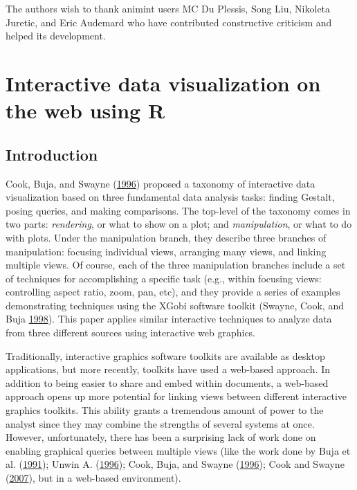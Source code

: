 \documentclass[12pt,]{isuthesis}
\begin{document}
The authors wish to thank animint users MC Du Plessis, Song Liu,
Nikoleta Juretic, and Eric Audemard who have contributed constructive
criticism and helped its development.

\chapter{Interactive data visualization on the web using R}

\section{Introduction}\label{introduction-1}

Cook, Buja, and Swayne (\protect\hyperlink{ref-Cook:2007uk}{1996})
proposed a taxonomy of interactive data visualization based on three
fundamental data analysis tasks: finding Gestalt, posing queries, and
making comparisons. The top-level of the taxonomy comes in two parts:
\emph{rendering}, or what to show on a plot; and \emph{manipulation}, or
what to do with plots. Under the manipulation branch, they describe
three branches of manipulation: focusing individual views, arranging
many views, and linking multiple views. Of course, each of the three
manipulation branches include a set of techniques for accomplishing a
specific task (e.g., within focusing views: controlling aspect ratio,
zoom, pan, etc), and they provide a series of examples demonstrating
techniques using the XGobi software toolkit (Swayne, Cook, and Buja
\protect\hyperlink{ref-xgobi}{1998}). This paper applies similar
interactive techniques to analyze data from three different sources
using interactive web graphics.

Traditionally, interactive graphics software toolkits are available as
desktop applications, but more recently, toolkits have used a web-based
approach. In addition to being easier to share and embed within
documents, a web-based approach opens up more potential for linking
views between different interactive graphics toolkits. This ability
grants a tremendous amount of power to the analyst since they may
combine the strengths of several systems at once. However,
unfortunately, there has been a surprising lack of work done on enabling
graphical queries between multiple views (like the work done by Buja et
al. (\protect\hyperlink{ref-Buja:1991vh}{1991}); Unwin A.
(\protect\hyperlink{ref-MANET}{1996}); Cook, Buja, and Swayne
(\protect\hyperlink{ref-Cook:2007uk}{1996}); Cook and Swayne
(\protect\hyperlink{ref-ggobi:2007}{2007}), but in a web-based
environment).
\end{document}
